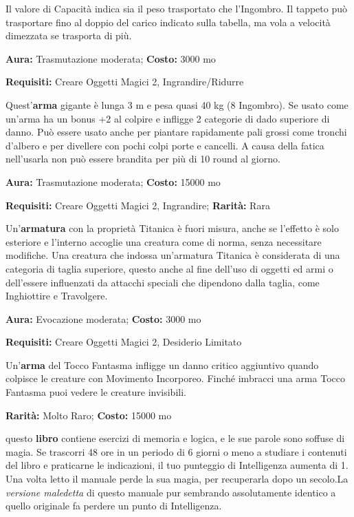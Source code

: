 \begin{multicols}{2}
\medskip
Il valore di Capacità indica sia il peso trasportato che l'Ingombro. Il tappeto può trasportare fino al doppio del carico indicato sulla tabella, ma vola a velocità dimezzata se trasporta di più.


\textbf{Aura:} Trasmutazione moderata; \textbf{Costo:} 3000 mo

\textbf{Requisiti:} Creare Oggetti Magici 2, Ingrandire/Ridurre

Quest'\textbf{arma} gigante è lunga 3 m e pesa quasi 40 kg (8 Ingombro). Se usato come un'arma ha un bonus +2 al colpire e infligge 2 categorie di dado superiore di danno. Può essere usato anche per piantare rapidamente pali grossi come tronchi d'albero e per divellere con pochi colpi porte e cancelli. A causa della fatica nell'usarla non può essere brandita per più di 10 round al giorno.


\textbf{Aura:} Trasmutazione moderata; \textbf{Costo:} 15000 mo

\textbf{Requisiti:} Creare Oggetti Magici 2, Ingrandire; \textbf{Rarità:} Rara

Un'\textbf{armatura} con la proprietà Titanica è fuori misura, anche se l'effetto è solo esteriore e l'interno accoglie una creatura come di norma, senza necessitare modifiche. Una creatura che indossa un'armatura Titanica è considerata di una categoria di taglia superiore, questo anche al fine dell'uso di oggetti ed armi o dell'essere influenzati da attacchi speciali che dipendono dalla taglia, come Inghiottire e Travolgere.


\textbf{Aura:} Evocazione moderata; \textbf{Costo:} 3000 mo

\textbf{Requisiti:} Creare Oggetti Magici 2, Desiderio Limitato

Un'\textbf{arma} del Tocco Fantasma infligge un danno critico aggiuntivo quando colpisce le creature con Movimento Incorporeo. Finché imbracci una arma Tocco Fantasma puoi vedere le creature invisibili.


\textbf{Rarità:} Molto Raro; \textbf{Costo:} 15000 mo

questo \textbf{libro} contiene esercizi di memoria e logica, e le sue parole sono soffuse di magia. Se trascorri 48 ore in un periodo di 6 giorni o meno a studiare i contenuti del libro e praticarne le indicazioni, il tuo punteggio di Intelligenza aumenta di 1. Una volta letto il manuale perde la sua magia, per recuperarla dopo un secolo.La \emph{versione maledetta} di questo manuale pur sembrando assolutamente identico a quello originale fa perdere un punto di Intelligenza.


\end{multicols}
